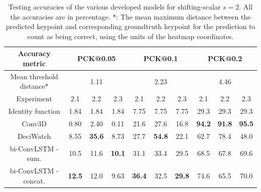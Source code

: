 \documentclass[./main.tex]{subfiles}
\begin{document}
\begin{table}[htbp]
    \begin{tabular}{c||ccc|ccc|ccc}
        \hline
        Accuracy metric & \multicolumn{3}{c}{PCK@0.05} & \multicolumn{3}{c}{PCK@0.1} & \multicolumn{3}{c}{PCK@0.2} \\
        \hline
        Mean threshold distance* & \multicolumn{3}{c}{1.11} & \multicolumn{3}{c}{2.23} & \multicolumn{3}{c}{4.46} \\
        \hline
        Experiment & 2.1 & 2.2 & 2.3 & 2.1 & 2.2 & 2.3 & 2.1 & 2.2 & 2.3 \\
        \hline
        \hline
        Identity function & 1.84 & 1.84 & 1.84 & 7.75 & 7.75 & 7.75 & 29.3 & 29.3 & 29.3 \\
        Conv3D & 0.80 & 2.40 & 0.11 & 21.6 & 27.6 & 16.8 & \textbf{94.2} & \textbf{91.8} & \textbf{95.5} \\
        DeciWatch & 8.55 & \textbf{35.6} & 8.73 & 27.7 & \textbf{54.8} & 22.1 & 62.7 & 78.4 & 48.0 \\
        bi-ConvLSTM - sum. & 10.5 & 11.6 & \textbf{10.1} & 31.1 & 33.4 & 29.5 & 68.5 & 67.8 & 69.6 \\
        bi-ConvLSTM - concat. & \textbf{12.5} & 12.0 & 9.63 & \textbf{36.4} & 32.5 & \textbf{29.8} & 74.6 & 65.5 & 70.0 \\
        \hline
    \end{tabular}
    \caption{Testing accuracies of the various developed models for shifting-scalar $s = 2$. All the accuracies are in percentage. *: The mean maximum distance between the predicted keypoint and corresponding groundtruth keypoint for the prediction to count as being correct, using the units of the heatmap coordinates.}
    \label{tab:pretrain_test_accs_2}
\end{table}
\end{document}
